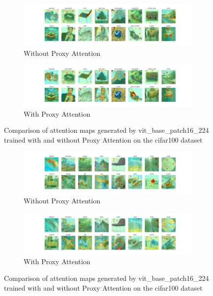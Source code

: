 
    \begin{figure}[H]
        \centering
        \begin{subfigure}[b]{1\textwidth}
            \includegraphics[width=\textwidth]{images/cifar100_vit_base_patch16_224_noproxy_0.pdf}
            \caption{Without Proxy Attention}
        \end{subfigure}
        \hfill
        \begin{subfigure}[b]{1\textwidth}
            \includegraphics[width=\textwidth]{images/cifar100_vit_base_patch16_224_proxy_0.pdf}
            \caption{With Proxy Attention}
        \end{subfigure}
        \caption{Comparison of attention maps generated by vit\_base\_patch16\_224 trained with and without Proxy Attention on the cifar100 dataset}
    \end{figure}
    

    \begin{figure}[H]
        \centering
        \begin{subfigure}[b]{1\textwidth}
            \includegraphics[width=\textwidth]{images/cifar100_vit_base_patch16_224_noproxy_1.pdf}
            \caption{Without Proxy Attention}
        \end{subfigure}
        \hfill
        \begin{subfigure}[b]{1\textwidth}
            \includegraphics[width=\textwidth]{images/cifar100_vit_base_patch16_224_proxy_1.pdf}
            \caption{With Proxy Attention}
        \end{subfigure}
        \caption{Comparison of attention maps generated by vit\_base\_patch16\_224 trained with and without Proxy Attention on the cifar100 dataset}
    \end{figure}
    

